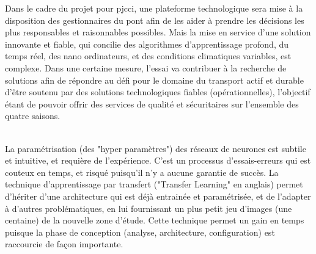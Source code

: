 ﻿\noindent Dans le cadre du projet pour \acrshort{pjcci}, une plateforme technologique sera mise à la disposition des gestionnaires du pont afin de les aider à prendre les décisions les plus responsables et raisonnables possibles. Mais la mise en service d'une solution innovante et fiable, qui concilie des algorithmes d'apprentissage profond, du temps réel, des nano ordinateurs, et des conditions climatiques variables, est complexe. Dans une certaine mesure, l'essai va contribuer à la recherche de solutions afin de répondre au défi pour le domaine du transport actif et durable d'être soutenu par des solutions technologiques fiables (opérationnelles), l'objectif étant de pouvoir offrir des services de qualité et sécuritaires sur l'ensemble des quatre saisons.
\begin{comment}
\vspace{\baselineskip}
\\
\noindent Il est difficile de trouver des jeux de données pour entrainer les réseaux de neurones pleinement connectés (\acrshort{fcn}) adaptés à la problématique. La technique de transfert d'apprentissage permet de démarrer d'une architecture qui a déjà appris avec un jeu d'images important (milliers d'images), et de lui faire apprendre davantage, en lui fournissant un plus petit jeu d'images (centaines d'images) de la nouvelle zone d'étude. Par exemple une architecture peut avoir appris à classifier des images de la Californie, aux États-Unis. Pour lui permettre de classifier des images de la Ville de Sherbrooke, il est souhaitable de lui fournir un nouveau jeu de données spécifique à cette ville afin qu'il s'adapte (ses paramètres) à cette région. Dans le contexte de cet essai, cela se traduit par ré entrainer différents modèles avec des images de la piste multifonctionnelle du pont Jacques-Cartier.
\end{comment}
\vspace{\baselineskip}
\\
\noindent La paramétrisation (des "hyper paramètres") des réseaux de neurones est subtile et intuitive, et requière de l'expérience. C'est un processus d'essais-erreurs qui est couteux en temps, et risqué puisqu'il n'y a aucune garantie de succès. La technique d'apprentissage par transfert ("Transfer Learning" en anglais) permet d'hériter d'une architecture qui est déjà entrainée et paramétrisée, et de l'adapter à d'autres problématiques, en lui fournissant un plus petit jeu d'images (une centaine) de la nouvelle zone d'étude. Cette technique permet un gain en temps puisque la phase de conception (analyse, architecture, configuration) est raccourcie de façon importante.
